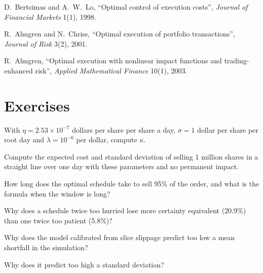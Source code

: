 \begin{omsources}
\item D.~Bertsimas and A.~W.~Lo, ``Optimal control of execution costs'', \emph{Journal of Financial Markets} 1(1), 1998.
\item R.~Almgren and N.~Chriss, ``Optimal execution of portfolio transactions'', \emph{Journal of Risk} 3(2), 2001.
\item R.~Almgren, ``Optimal execution with nonlinear impact functions and trading-enhanced risk'', \emph{Applied Mathematical Finance} 10(1), 2003.
\end{omsources}

\section{Exercises}

\begin{exercise}[$\star$]\label{exo:mx:the-almgren-chriss-framework:1}
With $\eta=2.53\times10^{-7}$ dollars per share per share a day, $\sigma=1$ dollar per share per root day and $\lambda=10^{-6}$ per dollar, compute $\kappa$.
\end{exercise}

\begin{exercise}[$\star$]\label{exo:mx:the-almgren-chriss-framework:2}
Compute the expected cost and standard deviation of selling 1 million shares in a straight line over one day with these parameters and no permanent impact.
\end{exercise}

\begin{exercise}[$\star$]\label{exo:mx:the-almgren-chriss-framework:3}
How long does the optimal schedule take to sell 95\% of the order, and what is the formula when the window is long?
\end{exercise}

\begin{exercise}[$\star\star$]\label{exo:mx:the-almgren-chriss-framework:4}
Why does a schedule twice too hurried lose more certainty equivalent (20.9\%) than one twice too patient (5.8\%)?
\end{exercise}

\begin{exercise}[$\star\star$]\label{exo:mx:the-almgren-chriss-framework:5}
Why does the model calibrated from slice slippage predict too low a mean shortfall in the simulation?
\end{exercise}

\begin{exercise}[$\star\star$]\label{exo:mx:the-almgren-chriss-framework:6}
Why does it predict too high a standard deviation?
\end{exercise}


